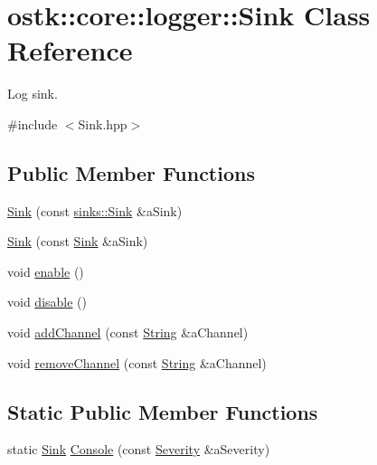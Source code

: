 \hypertarget{classostk_1_1core_1_1logger_1_1_sink}{}\section{ostk\+:\+:core\+:\+:logger\+:\+:Sink Class Reference}
\label{classostk_1_1core_1_1logger_1_1_sink}


Log sink.  




{\ttfamily \#include $<$Sink.\+hpp$>$}

\subsection*{Public Member Functions}
\begin{DoxyCompactItemize}
\item 
\hyperlink{classostk_1_1core_1_1logger_1_1_sink_ac28d087af4ba547441eec028b959ab91}{Sink} (const \hyperlink{classostk_1_1core_1_1logger_1_1sinks_1_1_sink}{sinks\+::\+Sink} \&a\+Sink)
\item 
\hyperlink{classostk_1_1core_1_1logger_1_1_sink_aadf37265845ad9648afcb7d07f0756ca}{Sink} (const \hyperlink{classostk_1_1core_1_1logger_1_1_sink}{Sink} \&a\+Sink)
\item 
void \hyperlink{classostk_1_1core_1_1logger_1_1_sink_aba09f6fd4b47c6dbcf755834ea531c17}{enable} ()
\item 
void \hyperlink{classostk_1_1core_1_1logger_1_1_sink_a0ab42f184deb76938ae3ab97f690fbaf}{disable} ()
\item 
void \hyperlink{classostk_1_1core_1_1logger_1_1_sink_a7dba5710eb033df07cfe7ead0104a122}{add\+Channel} (const \hyperlink{classostk_1_1core_1_1types_1_1_string}{String} \&a\+Channel)
\item 
void \hyperlink{classostk_1_1core_1_1logger_1_1_sink_ac11d2e63d7643cdbf8a24718ce2dd216}{remove\+Channel} (const \hyperlink{classostk_1_1core_1_1types_1_1_string}{String} \&a\+Channel)
\end{DoxyCompactItemize}
\subsection*{Static Public Member Functions}
\begin{DoxyCompactItemize}
\item 
static \hyperlink{classostk_1_1core_1_1logger_1_1_sink}{Sink} \hyperlink{classostk_1_1core_1_1logger_1_1_sink_a363d47c4b76945b5aa75f0b21b7740c2}{Console} (const \hyperlink{namespaceostk_1_1core_1_1logger_a52d02954e094391f067befffe7f3cae9}{Severity} \&a\+Severity)
\end{DoxyCompactItemize}


